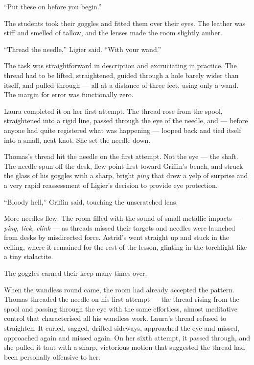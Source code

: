 \enquote{Put these on before you begin.}
 
The students took their goggles and fitted them over their eyes. The leather was stiff and smelled of tallow, and the lenses made the room slightly amber.
 
\enquote{Thread the needle,} Ligier said. \enquote{With your wand.}
 
The task was straightforward in description and excruciating in practice. The thread had to be lifted, straightened, guided through a hole barely wider than itself, and pulled through --- all at a distance of three feet, using only a wand. The margin for error was functionally zero.
 
Laura completed it on her first attempt. The thread rose from the spool, straightened into a rigid line, passed through the eye of the needle, and --- before anyone had quite registered what was happening --- looped back and tied itself into a small, neat knot. She set the needle down.
 
Thomas's thread hit the needle on the first attempt. Not the eye --- the shaft. The needle spun off the desk, flew point-first toward Griffin's bench, and struck the glass of his goggles with a sharp, bright \textit{ping} that drew a yelp of surprise and a very rapid reassessment of Ligier's decision to provide eye protection.
 
\enquote{Bloody hell,} Griffin said, touching the unscratched lens.
 
More needles flew. The room filled with the sound of small metallic impacts --- \textit{ping, tick, clink} --- as threads missed their targets and needles were launched from desks by misdirected force. Astrid's went straight up and stuck in the ceiling, where it remained for the rest of the lesson, glinting in the torchlight like a tiny stalactite.
 
The goggles earned their keep many times over.
 
When the wandless round came, the room had already accepted the pattern. Thomas threaded the needle on his first attempt --- the thread rising from the spool and passing through the eye with the same effortless, almost meditative control that characterised all his wandless work. Laura's thread refused to straighten. It curled, sagged, drifted sideways, approached the eye and missed, approached again and missed again. On her sixth attempt, it passed through, and she pulled it taut with a sharp, victorious motion that suggested the thread had been personally offensive to her.
 
